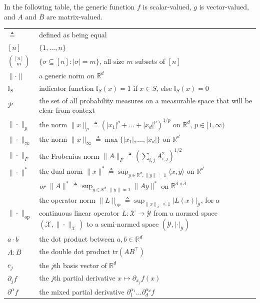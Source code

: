\documentclass[12pt,paper=letter]{scrreprt}
\def\defeq{\triangleq} %
\newcommand{\sset}{\sigma} %
\begin{document}
In the following table, the generic function $f$ is scalar-valued, $g$ is vector-valued, and $A$ and $B$ are matrix-valued.

\begin{longtable*}{p{.20\textwidth} p{.70\textwidth} } 
$\defeq$ & defined as being equal \\
$[n]$ & $\{1  , \dots , n \}$ \\
$\binom{[n]}{m}$ & $\{\sset\subseteq [n] : |\sset| = m\}$, all size $m$ subsets of $[n]$ \\
$\|\cdot\|$ & a generic norm on $\mathbb{R}^d$ \\
$\mathbb{I}_S$ & indicator function $\mathbb{I}_S(x) = 1$ if $x \in S$, else $\mathbb{I}_S(x) = 0$ \\
$\mathcal{P}$ & the set of all probability measures on a measurable space that will be clear from context \\
$\|\cdot\|_p$ & the norm $\|x\|_p \defeq (|x_1|^p + \dots + |x_d|^p)^{1/p}$ on $\mathbb{R}^d$, $p \in [1,\infty)$ \\
$\|\cdot\|_\infty$ & the norm $\|x\|_\infty \defeq \max\{ |x_1| , \dots , |x_d| \}$ on $\mathbb{R}^d$ \\
$\|\cdot\|_F$ & the Frobenius norm $\|A\|_F \defeq (\sum_{i,j} A_{i,j}^2)^{1/2}$ \\
$\|\cdot\|^*$ & the dual norm $\|x\|^* \defeq \sup_{y \in \mathbb{R}^d, \|y\| = 1} \langle x , y \rangle$ on $\mathbb{R}^d$ \\
& \emph{or} $\|A\|^* \defeq  \sup_{y \in \mathbb{R}^d , \|y\| = 1} \|A y\|^*$ on $\mathbb{R}^{d \times d}$ \\
$\|\cdot\|_{\mathrm{op}}$ & the operator norm $\|L\|_{\mathrm{op}} \defeq \sup_{\|x\|_{\mathcal{X}} \leq 1} |L(x)|_{\mathcal{Y}}$, for a continuous linear operator $L : \mathcal{X} \rightarrow \mathcal{Y}$ from a normed space $(\mathcal{X},\|\cdot\|_{\mathcal{X}})$ to a semi-normed space $(\mathcal{Y},|\cdot|_{\mathcal{Y}})$ \\
$a \cdot b$ & the dot product between $a,b \in \mathbb{R}^d$ \\
$A:B$ & the double dot product $\mathrm{tr}(AB^\top)$ \\
$e_j$ & the $j$th basis vector of $\mathbb{R}^d$ \\
$\partial_j f$ & the $j$th partial derivative $x \mapsto \partial_{x_j} f(x)$ \\
$\partial^\alpha f$ & the mixed partial derivative $\partial_1^{\alpha_1} \dots \partial_d^{\alpha_d} f $ \\

\end{longtable*}
\end{document}
